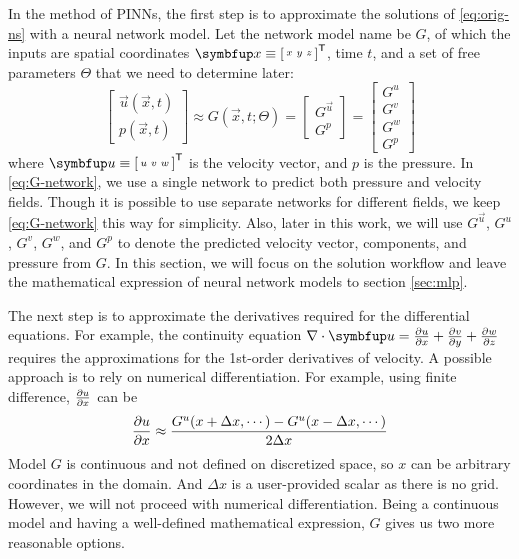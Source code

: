 In the method of PINNs, the first step is to approximate the solutions of \eqref{eq:orig-ns} with a neural network model.
Let the network model name be $G$, of which the inputs are spatial coordinates $\vec{x}\equiv\begin{bsmallmatrix}x & y & z\end{bsmallmatrix}^\mathsf{T}$, time $t$, and a set of free parameters $\Theta$ that we need to determine later:
\begin{equation}\label{eq:G-network}
    \begin{bmatrix}
        \vec{u}(\vec{x}, t) \\ p(\vec{x}, t)
    \end{bmatrix}
    \approx
    G(\vec{x}, t; \Theta)
    =
    \begin{bmatrix}
        G^{\vec{u}} \\
        G^p
    \end{bmatrix}
    =
    \begin{bmatrix}
        G^u \\
        G^v \\
        G^w \\
        G^p
    \end{bmatrix}
\end{equation}
where $\vec{u}\equiv\begin{bsmallmatrix}u & v & w\end{bsmallmatrix}^\mathsf{T}$ is the velocity vector, and $p$ is the pressure.
In \eqref{eq:G-network}, we use a single network to predict both pressure and velocity fields.
Though it is possible to use separate networks for different fields, we keep \eqref{eq:G-network} this way for simplicity.
Also, later in this work, we will use $G^{\vec{u}}$, $G^u$, $G^v$, $G^w$, and $G^p$ to denote the predicted velocity vector, components, and pressure from $G$.
In this section, we will focus on the solution workflow \cite{dissanayake_neural-network-based_1994,lagaris_artificial_1998,cai_physics-informed_2021} and leave the mathematical expression of neural network models to section \ref{sec:mlp}.

The next step is to approximate the derivatives required for the differential equations.
For example, the continuity equation $\nabla \cdot \vec{u} = \pdiff{u}{x} + \pdiff{v}{y} + \pdiff{w}{z}$ requires the approximations for the 1st-order derivatives of velocity.
A possible approach is to rely on numerical differentiation.
For example, using finite difference, $\frac{\partial u}{\partial x}$ can be
\begin{equation*}
    \frac{\partial u}{\partial x} \approx \frac{G^u(x+\Delta x, \cdots)-G^u(x-\Delta x, \cdots)}{2\Delta x} 
\end{equation*}
Model $G$ is continuous and not defined on discretized space, so $x$ can be arbitrary coordinates in the domain.
And $\Delta x$ is a user-provided scalar as there is no grid.
However, we will not proceed with numerical differentiation. 
Being a continuous model and having a well-defined mathematical expression, $G$ gives us two more reasonable options.

